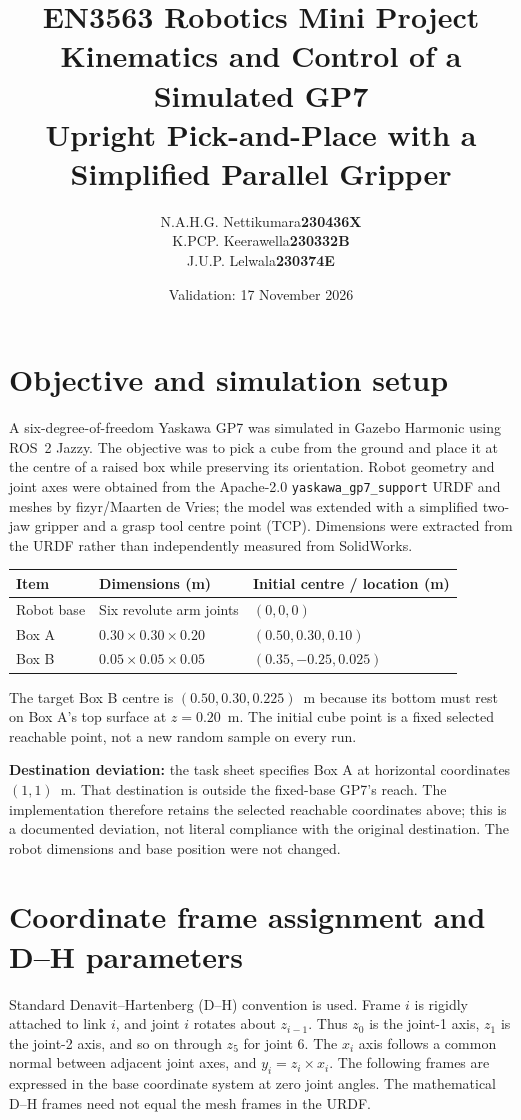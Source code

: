 \documentclass[10pt,a4paper]{article}
\title{\vspace{-12mm}EN3563 Robotics Mini Project\\
\large Kinematics and Control of a Simulated GP7\\
\normalsize Upright Pick-and-Place with a Simplified Parallel Gripper}
\author{\small\begin{tabular}{ll}
N.A.H.G. Nettikumara & \textbf{230436X}\\
K.PCP. Keerawella & \textbf{230332B}\\
J.U.P. Lelwala & \textbf{230374E}
\end{tabular}}
\date{Validation: 17 November 2026}
\begin{document}
\maketitle
\vspace{-6mm}

\section{Objective and simulation setup}
A six-degree-of-freedom Yaskawa GP7 was simulated in Gazebo Harmonic using
ROS~2 Jazzy. The objective was to pick a cube from the ground and place it at
the centre of a raised box while preserving its orientation. Robot geometry
and joint axes were obtained from the Apache-2.0 \texttt{yaskawa\_gp7\_support}
URDF and meshes by fizyr/Maarten de Vries; the
model was extended with a simplified two-jaw gripper and a grasp tool centre
point (TCP). Dimensions were extracted from the URDF rather than independently
measured from SolidWorks.

\begin{center}
\begin{tabular}{lll}
\toprule
Item & Dimensions (m) & Initial centre / location (m)\\
\midrule
Robot base & Six revolute arm joints & $(0,0,0)$\\
Box A & $0.30\times0.30\times0.20$ & $(0.50,0.30,0.10)$\\
Box B & $0.05\times0.05\times0.05$ & $(0.35,-0.25,0.025)$\\
\bottomrule
\end{tabular}
\end{center}
The target Box B centre is $(0.50,0.30,0.225)$~m because its bottom must rest
on Box A's top surface at $z=0.20$~m. The initial cube point is a fixed selected
reachable point, not a new random sample on every run.

\textbf{Destination deviation:} the task sheet specifies Box A at horizontal
coordinates $(1,1)$~m. That destination is outside the fixed-base GP7's reach.
The implementation therefore retains the selected reachable coordinates above;
this is a documented deviation, not literal compliance with the original
destination. The robot dimensions and base position were not changed.

\section{Coordinate frame assignment and D--H parameters}
Standard Denavit--Hartenberg (D--H) convention is used. Frame $i$ is rigidly
attached to link $i$, and joint $i$ rotates about $z_{i-1}$. Thus $z_0$ is the
joint-1 axis, $z_1$ is the joint-2 axis, and so on through $z_5$ for joint 6.
The $x_i$ axis follows a common normal between adjacent joint axes, and
$y_i=z_i\times x_i$. The following frames are expressed in the base coordinate
system at zero joint angles. The mathematical D--H frames need not equal the
mesh frames in the URDF.
\end{document}
